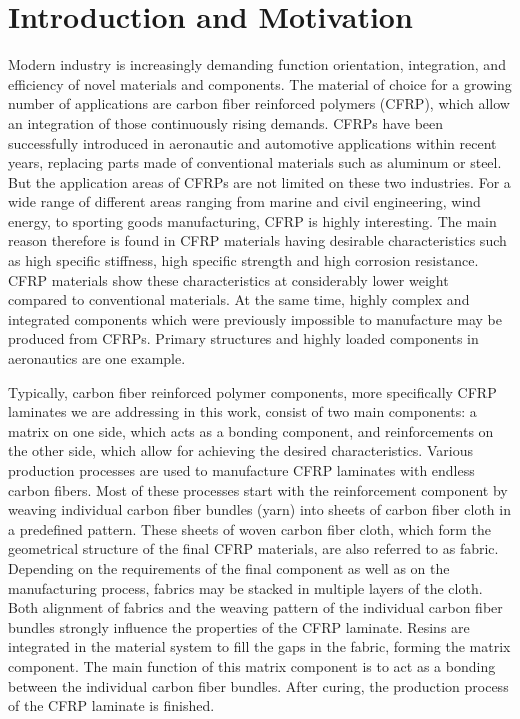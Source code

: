 


\section{Introduction and Motivation}
\label{sec:intro}
Modern industry is increasingly demanding function orientation, integration, and efficiency of novel materials and components. The material of choice for a growing number of applications are carbon fiber reinforced polymers (CFRP), which allow an integration of those continuously rising demands. CFRPs have been successfully introduced in aeronautic and automotive applications within recent years, replacing parts made of conventional materials such as aluminum or steel. But the application areas of CFRPs are not limited on these two industries. For a wide range of different areas ranging from marine and civil engineering, wind energy, to sporting goods manufacturing, CFRP is highly interesting. The main reason therefore is found in CFRP materials having desirable characteristics such as high specific stiffness, high specific strength and high corrosion resistance. CFRP materials show these characteristics at considerably lower weight compared to conventional materials. At the same time, highly complex and integrated components which were previously impossible to manufacture may be produced from CFRPs. Primary structures and highly loaded components in aeronautics are one example.

Typically, carbon fiber reinforced polymer components, more specifically CFRP laminates we are addressing in this work, consist of two main components:
a matrix on one side, which acts as a bonding component, and  reinforcements on the other side, which allow for achieving the desired characteristics.  Various production processes are used to manufacture CFRP laminates with endless carbon fibers. Most of these processes start with the reinforcement component by weaving individual carbon fiber bundles (yarn) into sheets of carbon fiber cloth in a predefined pattern. These sheets of woven carbon fiber cloth, which form the geometrical structure of the final CFRP materials, are also referred to as fabric. Depending on the requirements of the final component as well as on the manufacturing process, fabrics may be stacked in multiple layers of the cloth. Both alignment of fabrics and the weaving pattern of the individual carbon fiber bundles strongly influence the properties of the CFRP laminate. Resins are integrated in the material system to fill the gaps in the fabric, forming the matrix component. The main function of this matrix component is to act as a bonding between the individual carbon fiber bundles. After curing, the production process of the CFRP laminate is finished. 

